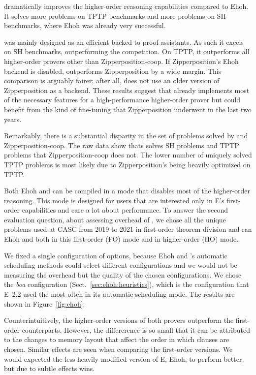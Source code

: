  \ehohii{} dramatically improves the higher-order reasoning capabilities
  compared to Ehoh. It solves  more problems on TPTP benchmarks
  and  more problems on SH benchmarks, where Ehoh was already very
  successful.
  
  \ehohii{} was mainly designed as an efficient backed to proof assistants. As such it 
  excels on SH benchmarks, outperforming the competition. On TPTP, it outperforms all higher-order provers other than Zipperposition-coop.
  If Zipperposition's Ehoh backend is disabled,
  \ehohii{} outperforms Zipperposition by a wide margin.
  This comparison is arguably fairer; after all,
  \ehohii{} does not use an older version of Zipperposition
  as a backend.
  These results suggest that \ehohii{} already implements most of the necessary features
  for a high-performance higher-order prover
  but could benefit from the kind of fine-tuning that
  Zipperposition underwent in the last two years.
  
  Remarkably, there is a substantial disparity in the set of problems solved by
  \ehohii{} and Zipperposition-coop. The raw data show thats \ehohii{} solves
   SH problems and  TPTP problems that Zipperposition-coop
  does not. The lower number of uniquely solved TPTP problems is most likely 
  due to Zipperposition's being heavily optimized on TPTP.
  
   Both Ehoh and \ehohii{} can be compiled
  in a mode that disables most of the higher-order reasoning. This mode is
  designed for users that are interested only in E's first-order capabilities and
  care a lot about performance.
  To answer the second
  evaluation question, about assessing overhead of \ehohii{},
  we chose all the  unique problems used at CASC
  from 2019 to 2021 in first-order theorem division and ran Ehoh and \ehohii{}
  both in this first-order (FO) mode and in higher-order (HO) mode.
  
  We fixed a single
  configuration of options, because Ehoh and \ehohii{}'s
  automatic scheduling methods could select different configurations
  and we would not be measuring the overhead but the quality of the chosen
  configurations. We chose the \emph{boa} configuration (Sect.~\ref{sec:ehoh:heuristics}),
  which is the configuration that E~2.2 used the most often in its automatic scheduling mode.
  The results are shown in Figure~\ref{fig:ehoh}.
  
  Counterintuitively, the higher-order versions of both provers outperform
  the first-order counterparts. However, the differerence is so small that it can
  be attributed to the changes to memory layout that affect the order in which
  clauses are chosen. Similar effects are seen when comparing the first-order versions.
  We would expected the less heavily modified version of E, Ehoh, to perform better,
  but due to subtle effects \ehohii{} wins.
  
